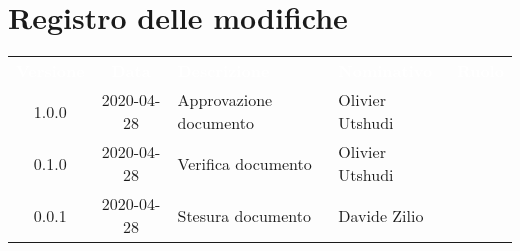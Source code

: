 \section*{Registro delle modifiche}
{
	\centering
	\begin{longtable}{ c c C{4cm}  C{4cm}  C{3cm} }
		\textcolor{white}{\textbf{Versione}} & \textcolor{white}{\textbf{Data}} & \textcolor{white}{\textbf{Descrizione}} & \textcolor{white}{\textbf{Nominativo}} & \textcolor{white}{\textbf{Ruolo}}\\		
		1.0.0 & 2020-04-28 & Approvazione documento & Olivier Utshudi &\RdP{}\\		
		0.1.0 & 2020-04-28 & Verifica documento & Olivier Utshudi &\ver{}\\		
		0.0.1 & 2020-04-28 & Stesura documento & Davide Zilio &\reda{}\\		
		
	\end{longtable}
}